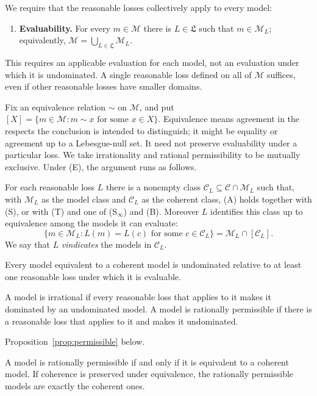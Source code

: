 \documentclass[11pt]{article}
\theoremstyle{definition}
\theoremstyle{remark}
\newcommand{\M}{\mathcal M}
\newcommand{\C}{\mathcal C}
\begin{document}
We require that the reasonable losses collectively apply to every model:
\begin{enumerate}[label=\textbf{(E)},leftmargin=*]
\item \textbf{Evaluability.} For every $m\in\M$ there is $L\in\mathfrak L$ such that $m\in\M_L$; equivalently, $\M=\bigcup_{L\in\mathfrak L}\M_L$.
\end{enumerate}
This requires an applicable evaluation for each model, not an evaluation under which it is undominated. A single reasonable loss defined on all of $\M$ suffices, even if other reasonable losses have smaller domains.

Fix an equivalence relation $\sim$ on $\M$, and put $[X]=\{m\in\M:m\sim x\text{ for some }x\in X\}$. Equivalence means agreement in the respects the conclusion is intended to distinguish; it might be equality or agreement up to a Lebesgue-null set. It need not preserve evaluability under a particular loss. We take irrationality and rational permissibility to be mutually exclusive. Under (E), the argument runs as follows.
\begin{description}[leftmargin=0pt]
\item[Premise 1.] For each reasonable loss $L$ there is a nonempty class $\C_L\subseteq\C\cap\M_L$ such that, with $\M_L$ as the model class and $\C_L$ as the coherent class, (A) holds together with (S), or with (T) and one of (S$_\infty$) and (B). Moreover $L$ identifies this class up to equivalence among the models it can evaluate:
\[
 \{m\in\M_L:L(m)=L(c)\text{ for some }c\in\C_L\}
 =\M_L\cap[\C_L].
\]
We say that $L$ \emph{vindicates} the models in $\C_L$.
\item[Premise 2.] Every model equivalent to a coherent model is undominated relative to at least one reasonable loss under which it is evaluable.
\item[Premise 3.] A model is irrational if every reasonable loss that applies to it makes it dominated by an undominated model. A model is rationally permissible if there is a reasonable loss that applies to it and makes it undominated.

\item[Theorem.] Proposition~\ref{prop:permissible} below.
\item[Conclusion.] A model is rationally permissible if and only if it is equivalent to a coherent model. If coherence is preserved under equivalence, the rationally permissible models are exactly the coherent ones.
\end{description}
\end{document}
